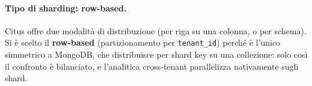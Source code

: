 \paragraph{Tipo di sharding: row-based.} Citus offre due modalità di distribuzione (per riga su una colonna,
o per schema). Si è scelto il \textbf{row-based} (partizionamento per \texttt{tenant\_id}) perché è l'unico
simmetrico a MongoDB, che distribuisce per shard key su una collezione: solo così il confronto è
bilanciato, e l'analitica cross-tenant parallelizza nativamente sugli shard.
